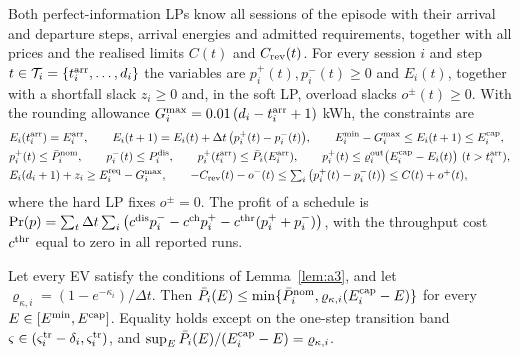 Both perfect-information LPs know all sessions of the episode with their arrival and departure steps, arrival energies and admitted requirements, together with all prices and the realised limits $C(t)$ and $C_{\mathrm{rev}}(t)$.
For every session $i$ and step $t\in\mathcal T_i=\{t_i^{\mathrm{arr}},\dots,d_i\}$ the variables are $p_i^{+}(t),p_i^{-}(t)\ge0$ and $E_i(t)$, together with a shortfall slack $z_i\ge0$ and, in the soft LP, overload slacks $o^{\pm}(t)\ge0$.
With the rounding allowance $G_i^{\max}=0.01\,(d_i-t_i^{\mathrm{arr}}+1)$ kWh, the constraints are
\begin{equation}\label{eq:lp}
\begin{aligned}
&E_i(t_i^{\sm{arr}})=E_i^{\sm{arr}},\qquad E_i(t+1)=E_i(t)+\Delta t\,\big(p_i^{+}(t)-p_i^{-}(t)\big),\qquad E_i^{\min}-G_i^{\max}\le E_i(t+1)\le E_i^{\sm{cap}},\\
&p_i^{+}(t)\le\Pnom_i,\qquad p_i^{-}(t)\le\Pdis_i,\qquad p_i^{+}(t_i^{\sm{arr}})\le\bar P_i(E_i^{\sm{arr}}),\qquad p_i^{+}(t)\le\varrho_i^{\sm{out}}\big(E_i^{\sm{cap}}-E_i(t)\big)\ (t>t_i^{\sm{arr}}),\\
&E_i(d_i+1)+z_i\ge\Ereq_i-G_i^{\max},\qquad -\Crev(t)-o^{-}(t)\le\textstyle\sum_{i}\big(p_i^{+}(t)-p_i^{-}(t)\big)\le C(t)+o^{+}(t),
\end{aligned}
\end{equation}
where the hard LP fixes $o^{\pm}=0$.
The profit of a schedule is $\mathrm{Pr}(p)=\sum_t\Delta t\sum_i\big(c^{\mathrm{dis}}p_i^{-}-c^{\mathrm{ch}}p_i^{+}-c^{\mathrm{thr}}(p_i^{+}+p_i^{-})\big)$, with the throughput cost $c^{\mathrm{thr}}$ equal to zero in all reported runs.

\begin{lemma}\label{lem:taperrows}
Let every EV satisfy the conditions of Lemma~\ref{lem:a3}, and let $\varrho_{\kappa,i}=(1-e^{-\kappa_i})/\Delta t$.
Then $\bar P_i(E)\le\min\{\bar P^{\mathrm{nom}}_i,\varrho_{\kappa,i}(E_i^{\mathrm{cap}}-E)\}$ for every $E\in[E^{\min},E^{\mathrm{cap}}]$.
Equality holds except on the one-step transition band $\varsigma\in(\varsigma_i^{\mathrm{tr}}-\delta_i,\varsigma_i^{\mathrm{tr}})$, and $\sup_E\bar P_i(E)/(E_i^{\mathrm{cap}}-E)=\varrho_{\kappa,i}$.
\end{lemma}

